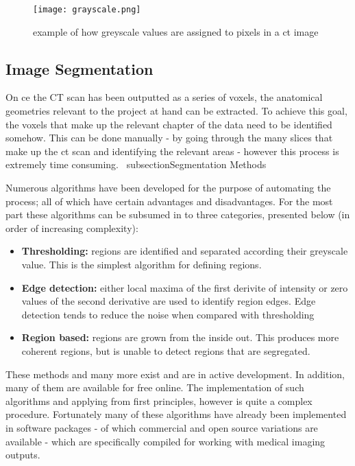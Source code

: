 \begin{figure}
  \texttt{[image: grayscale.png]}
\caption{example of how greyscale values are assigned to pixels in a ct image} \label{fig:greyscale}
\centering
\end{figure}
 
\subsection{Image Segmentation} 

On ce the CT scan has been outputted as a series of voxels, the anatomical geometries relevant to the project at hand can be extracted. To achieve this goal, the voxels that make up the relevant chapter of the data need to be identified somehow. This can be done manually - by going through the many slices that make up the ct scan and identifying the relevant areas - however this process is extremely time consuming.
\ subsection{Segmentation Methods}

Numerous algorithms have been developed for the purpose of automating the process; all of which have certain advantages and disadvantages. For the most part these algorithms can be subsumed in to three categories, presented below (in order of increasing complexity):

\begin{itemize}

  \item \textbf{Thresholding:} regions are identified and separated according their  greyscale value. This is the simplest algorithm for defining regions.

  \item \textbf{Edge detection:} either local maxima of the first derivite of intensity or zero values of the second derivative are used to identify region edges. Edge detection tends to reduce the noise when compared with thresholding

  \item	\textbf{Region based:} regions are grown from the inside out. This produces more coherent regions, but is unable to detect regions that are segregated.

\end{itemize}

These methods and many more exist and are in active development. In addition, many of them are available for free online. The implementation of such algorithms and applying from first principles, however is quite a complex procedure. Fortunately many of these algorithms have already been implemented in software packages - of which commercial and open source variations are available - which are specifically compiled for working with medical imaging outputs. 

